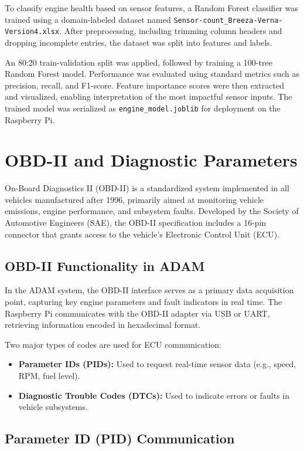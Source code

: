 To classify engine health based on sensor features, a Random Forest classifier was trained using a domain-labeled dataset named \texttt{Sensor-count\_Breeza-Verna-Version4.xlsx}. After preprocessing, including trimming column headers and dropping incomplete entries, the dataset was split into features and labels.

An 80:20 train-validation split was applied, followed by training a 100-tree Random Forest model. Performance was evaluated using standard metrics such as precision, recall, and F1-score. Feature importance scores were then extracted and visualized, enabling interpretation of the most impactful sensor inputs. The trained model was serialized as \texttt{engine\_model.joblib} for deployment on the Raspberry Pi.

\section{OBD-II and Diagnostic Parameters}

On-Board Diagnostics II (OBD-II) is a standardized system implemented in all vehicles manufactured after 1996, primarily aimed at monitoring vehicle emissions, engine performance, and subsystem faults. Developed by the Society of Automotive Engineers (SAE), the OBD-II specification includes a 16-pin connector that grants access to the vehicle’s Electronic Control Unit (ECU).

\subsection{OBD-II Functionality in ADAM}

In the ADAM system, the OBD-II interface serves as a primary data acquisition point, capturing key engine parameters and fault indicators in real time. The Raspberry Pi communicates with the OBD-II adapter via USB or UART, retrieving information encoded in hexadecimal format.

Two major types of codes are used for ECU communication:

\begin{itemize}
    \item \textbf{Parameter IDs (PIDs):} Used to request real-time sensor data (e.g., speed, RPM, fuel level).
    \item \textbf{Diagnostic Trouble Codes (DTCs):} Used to indicate errors or faults in vehicle subsystems.
\end{itemize}

\subsection{Parameter ID (PID) Communication}

